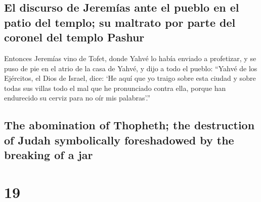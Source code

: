 \begin{paracol}{2}
\hypertarget{el-discurso-de-jeremuxedas-ante-el-pueblo-en-el-patio-del-templo-su-maltrato-por-parte-del-coronel-del-templo-pashur}{%
\subsection{El discurso de Jeremías ante el pueblo en el patio del
templo; su maltrato por parte del coronel del templo
Pashur}\label{el-discurso-de-jeremuxedas-ante-el-pueblo-en-el-patio-del-templo-su-maltrato-por-parte-del-coronel-del-templo-pashur}}

 Entonces Jeremías vino de Tofet, donde Yahvé lo había
enviado a profetizar, y se puso de pie en el atrio de la casa de Yahvé,
y dijo a todo el pueblo:  ``Yahvé de los Ejércitos, el
Dios de Israel, dice: `He aquí que yo traigo sobre esta ciudad y sobre
todas sus villas todo el mal que he pronunciado contra ella, porque han
endurecido su cerviz para no oír mis palabras'.''

\switchcolumn
\begin{otherlanguage}{english}

\hypertarget{the-abomination-of-thopheth-the-destruction-of-judah-symbolically-foreshadowed-by-the-breaking-of-a-jar}{%
\subsection{The abomination of Thopheth; the destruction of Judah
symbolically foreshadowed by the breaking of a
jar}\label{the-abomination-of-thopheth-the-destruction-of-judah-symbolically-foreshadowed-by-the-breaking-of-a-jar}}

\hypertarget{section-37}{%
\section{19}\label{section-37}}


\end{otherlanguage}
\end{paracol}
